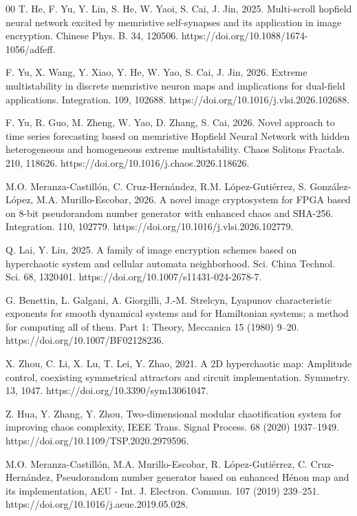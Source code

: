 \documentclass[preprint, 12pt, sort&compress]{elsarticle}
\begin{document}
\begin{thebibliography}{00}
T. He, F. Yu, Y. Lin, S. He, W. Yaoi, S. Cai, J. Jin, 2025. Multi-scroll hopfield neural network excited by memristive self-synapses and its application in image encryption. Chinese Phys. B. 34, 120506. https://doi.org/10.1088/1674-1056/adfeff.

F. Yu, X. Wang, Y. Xiao, Y. He, W. Yao, S. Cai, J. Jin, 2026. Extreme multistability in discrete memristive neuron maps and implications for dual-field applications. Integration. 109, 102688. https://doi.org/10.1016/j.vlsi.2026.102688.

F. Yu, R. Guo, M. Zheng, W. Yao, D. Zhang, S. Cai, 2026. Novel approach to time series forecasting based on memristive Hopfield Neural Network with hidden heterogeneous and homogeneous extreme multistability. Chaos Solitons Fractals. 210, 118626. https://doi.org/10.1016/j.chaos.2026.118626.

M.O. Meranza-Castillón, C. Cruz-Hernández, R.M. López-Gutiérrez, S. González-López, M.A. Murillo-Escobar, 2026. A novel image cryptosystem for FPGA based on 8-bit pseudorandom number generator with enhanced chaos and SHA-256. Integration. 110, 102779. https://doi.org/10.1016/j.vlsi.2026.102779.

Q. Lai, Y. Liu, 2025. A family of image encryption schemes based on hyperchaotic system and cellular automata neighborhood. Sci. China Technol. Sci. 68, 1320401. https://doi.org/10.1007/s11431-024-2678-7.

G. Benettin, L. Galgani, A. Giorgilli, J.-M. Strelcyn, Lyapunov characteristic exponents for smooth dynamical systems and for Hamiltonian systems; a method for computing all of them. Part 1: Theory, Meccanica 15 (1980) 9–20. https://doi.org/10.1007/BF02128236.

X. Zhou, C. Li, X. Lu, T. Lei, Y. Zhao, 2021. A 2D hyperchaotic map: Amplitude control, coexisting symmetrical attractors and circuit implementation. Symmetry. 13, 1047. https://doi.org/10.3390/sym13061047.

Z. Hua, Y. Zhang, Y. Zhou, Two-dimensional modular chaotification system for improving chaos complexity, IEEE Trans. Signal Process. 68 (2020) 1937–1949. https://doi.org/10.1109/TSP.2020.2979596.

M.O. Meranza-Castillón, M.A. Murillo-Escobar, R. López-Gutiérrez, C. Cruz-Hernández, Pseudorandom number generator based on enhanced Hénon map and its implementation, AEU - Int. J. Electron. Commun. 107 (2019) 239–251. https://doi.org/10.1016/j.aeue.2019.05.028.


\end{thebibliography}
\end{document}
